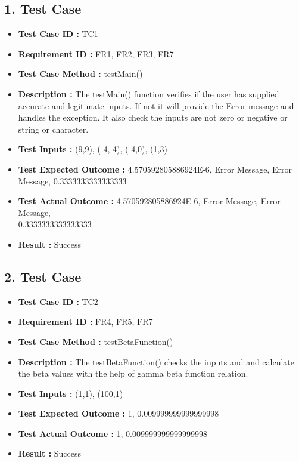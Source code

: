 \documentclass[12pt,a4paper]{report}
\begin{document}
\subsection*{1. Test Case}
    \begin{itemize}
        \item \textbf{Test Case ID : } TC1
        \item \textbf{Requirement ID : } FR1, FR2, FR3, FR7
        \item \textbf{Test Case Method : } testMain()
        \item \textbf{Description : } The testMain() function verifies if the user has supplied accurate and legitimate inputs. If not it will provide the Error message and handles the exception. It also check the inputs are not zero or negative or string or character. 
        \item \textbf{Test Inputs : }(9,9), (-4,-4), (-4,0), (1,3)
        \item \textbf{Test Expected Outcome : }4.570592805886924E-6, Error Message, Error Message, 0.3333333333333333
        \item \textbf{Test Actual Outcome : }4.570592805886924E-6, Error Message, Error Message,\\ 0.3333333333333333 
        \item \textbf{Result : }Success
    \end{itemize}

\subsection*{2. Test Case}
    \begin{itemize}
        \item \textbf{Test Case ID : } TC2
        \item \textbf{Requirement ID : } FR4, FR5, FR7
        \item \textbf{Test Case Method : } testBetaFunction()
        \item \textbf{Description : } The testBetaFunction() checks the inputs and and calculate the beta values with the help of gamma beta function relation. 
        \item \textbf{Test Inputs : }(1,1), (100,1)
        \item \textbf{Test Expected Outcome : }1, 0.009999999999999998
        \item \textbf{Test Actual Outcome : }1, 0.009999999999999998 
        \item \textbf{Result : }Success
    \end{itemize}
\end{document}
